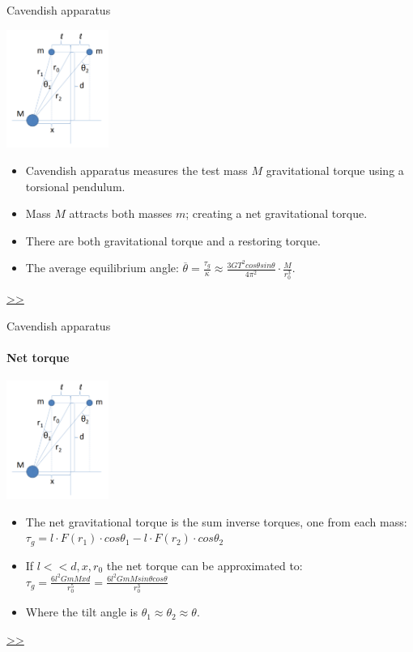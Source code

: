 \documentclass{beamer}
\begin{document}
\begin{frame}{Cavendish apparatus}
	\begin{center}		
		\includegraphics[width=0.25\textwidth,keepaspectratio]{Cavendish apparatus.PNG}
    \end{center}
	\begin{itemize}
		\item Cavendish apparatus measures the test mass $M$ gravitational torque using a torsional pendulum.
		\pause
		\item Mass $M$ attracts both masses $m$; creating a net gravitational torque.
		\item There are both gravitational torque and a restoring torque.
		\pause
		\item The average equilibrium angle: $\overline{\theta} = \frac{\tau_g}{\kappa} \approx \frac{3GT^2cos\theta sin\theta}{4\pi^2 } \cdot \frac{M}{r_0^3}$.

	\end{itemize}
	\hyperlink{frame:Gravimetric sensing}{>>} 
\end{frame}
\begin{frame}{Cavendish apparatus}
	\framesubtitle{Net torque}
	\begin{center}		
		\includegraphics[width=0.25\textwidth,keepaspectratio]{Cavendish apparatus.PNG}
    \end{center}
	\begin{itemize}
		\item The net gravitational torque is the sum inverse torques, one from each mass: $\tau_g = l \cdot F(r_1) \cdot cos\theta_1 - l \cdot F(r_2) \cdot cos\theta_2$
		\item If $l<<d,x,r_0$ the net torque can be approximated to: $\tau_g =  \frac{6l^2GmMxd} {r_0^5} = \frac{6l^2GmM sin\theta cos\theta}{r_0^3}$
		\item Where the tilt angle is $\theta_1 \approx \theta_2 \approx \theta$.
	\end{itemize}
	\hyperlink{frame:Gravimetric sensing}{>>} 
\end{frame}
\end{document}
